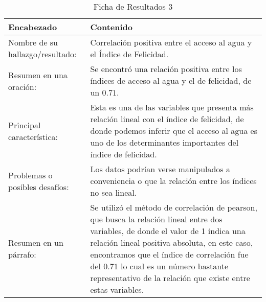 \begin{table}[H]
    \caption{Ficha de Resultados 3}
    \begin{center}
        \begin{tabular}{  m{3cm} | m{12cm}  }
        \hline
        \textbf{ Encabezado} & \textbf{Contenido }\\ 
        \hline
        Nombre de su hallazgo/resultado: & Correlación positiva entre el acceso al agua y el Índice de Felicidad.\\ 
        \hline
        Resumen en una oración: & Se encontró una relación positiva entre los índices de acceso al agua y el de felicidad, de un $0.71$. \\
        \hline
        Principal característica: &  Esta es una de las variables que presenta más relación lineal con el índice de felicidad, de donde podemos inferir que el acceso al agua es uno de los determinantes importantes del índice de felicidad.\\ 
        \hline
        Problemas o posibles desafíos: &  Los datos podrían verse manipulados a conveniencia o que la relación entre los índices no sea lineal. \\ 
        \hline
        Resumen en un párrafo: & Se utilizó el método de correlación de pearson, que busca la relación lineal entre dos variables, de donde el valor de 1 índica una relación lineal positiva absoluta, en este caso, encontramos que el índice de correlación fue del $0.71$ lo cual es un número bastante representativo de la relación que existe entre estas variables. \\ 
        \hline
        \end{tabular}
    \end{center}
\end{table}

